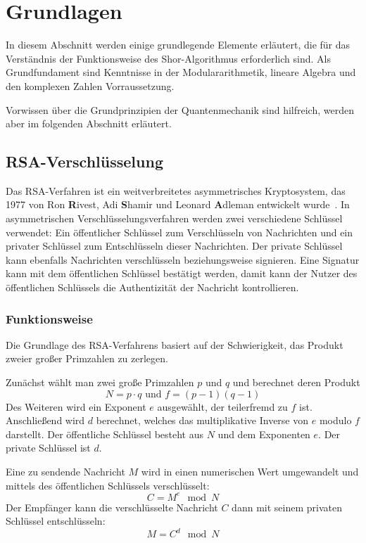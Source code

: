 \section{Grundlagen}
In diesem Abschnitt werden einige grundlegende Elemente erläutert, 
die für das Verständnis der Funktionsweise des Shor-Algorithmus erforderlich sind.
Als Grundfundament sind Kenntnisse in der Modulararithmetik, lineare Algebra und den komplexen Zahlen Vorraussetzung. 

Vorwissen über die Grundprinzipien der Quantenmechanik sind hilfreich, 
werden aber im folgenden Abschnitt erläutert. 


\subsection{RSA-Verschlüsselung}
Das RSA-Verfahren ist ein weitverbreitetes asymmetrisches Kryptosystem, 
das 1977 von Ron \textbf{R}ivest, Adi \textbf{S}hamir und Leonard \textbf{A}dleman entwickelt wurde~\cite{10.1145/359340.359342}. 
In asymmetrischen Verschlüsselungsverfahren werden zwei verschiedene Schlüssel verwendet: 
Ein öffentlicher Schlüssel zum Verschlüsseln von Nachrichten und ein privater Schlüssel zum Entschlüsseln dieser Nachrichten.
Der private Schlüssel kann ebenfalls Nachrichten verschlüsseln beziehungsweise signieren.
Eine Signatur kann mit dem öffentlichen Schlüssel bestätigt werden, 
damit kann der Nutzer des öffentlichen Schlüssels die Authentizität der Nachricht kontrollieren.

\subsubsection*{Funktionsweise}
Die Grundlage des RSA-Verfahrens basiert auf der Schwierigkeit, 
das Produkt zweier großer Primzahlen zu zerlegen. 

Zunächst wählt man zwei große Primzahlen \(p\) und \(q\) und 
berechnet deren Produkt 
\[N = p \cdot q \text{ und } f=(p-1)(q-1)\]  
Des Weiteren wird ein Exponent \(e\) ausgewählt, 
der teilerfremd zu \(f\) ist.
Anschließend wird \(d\) berechnet, 
welches das multiplikative Inverse von \(e\) modulo \(f\) darstellt.
Der öffentliche Schlüssel besteht aus \(N\) und dem Exponenten \(e\). 
Der private Schlüssel ist \(d\).

Eine zu sendende Nachricht \( M \) wird in einen numerischen Wert umgewandelt und mittels des öffentlichen Schlüssels verschlüsselt:
\[
  C = M^e \mod N
\]
Der Empfänger kann die verschlüsselte Nachricht \(C\) dann mit seinem privaten Schlüssel entschlüsseln:
\[
  M = C^d \mod N
\]

